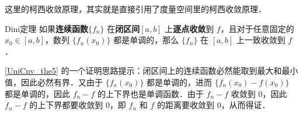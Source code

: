 这里的柯西收敛原理，其实就是直接引用了度量空间里的柯西收敛原理．

\begin{theorem}{Dini定理}\label{UniCnv_the5}
如果\textbf{连续函数}$\{f_n\}$ 在\textbf{闭区间}$[a, b]$ 上\textbf{逐点收敛}到 $f$，且对于任意固定的 $x_0\in [a, b]$，数列 $\{f_n(x_0)\}$ 都是单调的，那么 $\{f_n\}$ 在 $[a, b]$ 上一致收敛到 $f$．
\end{theorem}

\autoref{UniCnv_the5} 的一个证明思路提示：闭区间上的连续函数必然能取到最大和最小值，因此必然有界．又由于 $\{f_n(x_0)\}$ 都是单调的，进而 $\{f_n(x_0)-f(x_0)\}$ 都是单调的，因此 $f_n-f$ 的上下界也是单调函数．由于 $f_n-f$ 收敛到 $0$，因此 $f_n-f$ 的上下界都要收敛到 $0$，即 $f_n$ 和 $f$ 的距离要收敛到 $0$，从而得证．









